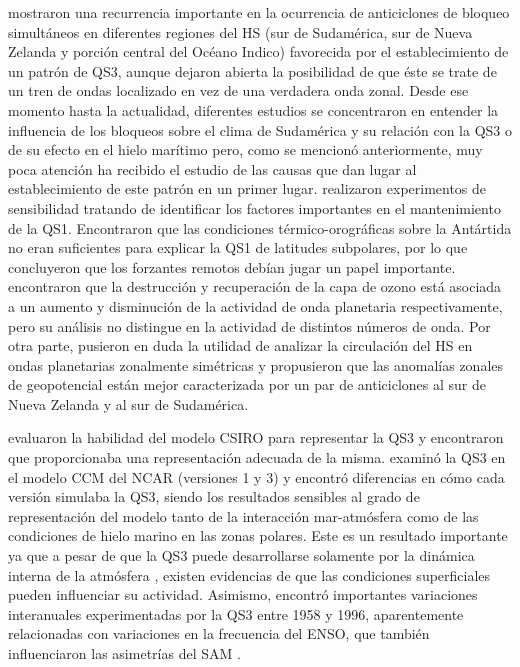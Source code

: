 \documentclass[spanish,a4paper,12pt,oneside]{book}
\begin{document}
\citet{Trenberth1985} mostraron una recurrencia importante en la
ocurrencia de anticiclones de bloqueo simultáneos en diferentes regiones
del HS (sur de Sudamérica, sur de Nueva Zelanda y porción central del
Océano Indico) favorecida por el establecimiento de un patrón de QS3,
aunque dejaron abierta la posibilidad de que éste se trate de un tren de
ondas localizado en vez de una verdadera onda zonal. Desde ese momento
hasta la actualidad, diferentes estudios se concentraron en entender la
influencia de los bloqueos sobre el clima de Sudamérica y su relación
con la QS3 \citep[ej.][]{Rao2004} o de su efecto en el hielo marítimo
\citep[ej.][]{Raphael2007} pero, como se mencionó anteriormente, muy
poca atención ha recibido el estudio de las causas que dan lugar al
establecimiento de este patrón en un primer lugar. \citet{Quintanar1995}
realizaron experimentos de sensibilidad tratando de identificar los
factores importantes en el mantenimiento de la QS1. Encontraron que las
condiciones térmico-orográficas sobre la Antártida no eran suficientes
para explicar la QS1 de latitudes subpolares, por lo que concluyeron que
los forzantes remotos debían jugar un papel importante. \citet{Wang2013}
encontraron que la destrucción y recuperación de la capa de ozono está
asociada a un aumento y disminución de la actividad de onda planetaria
respectivamente, pero su análisis no distingue en la actividad de
distintos números de onda. Por otra parte, \citet{Hobbs2010} pusieron en
duda la utilidad de analizar la circulación del HS en ondas planetarias
zonalmente simétricas y propusieron que las anomalías zonales de
geopotencial están mejor caracterizada por un par de anticiclones al sur
de Nueva Zelanda y al sur de Sudamérica.

\citet{Cai1999} evaluaron la habilidad del modelo CSIRO para representar
la QS3 y encontraron que proporcionaba una representación adecuada de la
misma. \citet{Raphael1998} examinó la QS3 en el modelo CCM del NCAR
(versiones 1 y 3) y encontró diferencias en cómo cada versión simulaba
la QS3, siendo los resultados sensibles al grado de representación del
modelo tanto de la interacción mar-atmósfera como de las condiciones de
hielo marino en las zonas polares. Este es un resultado importante ya
que a pesar de que la QS3 puede desarrollarse solamente por la dinámica
interna de la atmósfera \citep[ej.][]{Simpson2013}, existen evidencias
de que las condiciones superficiales pueden influenciar su actividad.
Asimismo, \citet{Raphael2003} encontró importantes variaciones
interanuales experimentadas por la QS3 entre 1958 y 1996, aparentemente
relacionadas con variaciones en la frecuencia del ENSO, que también
influenciaron las asimetrías del SAM \citep{Fogt2012}.
\end{document}
